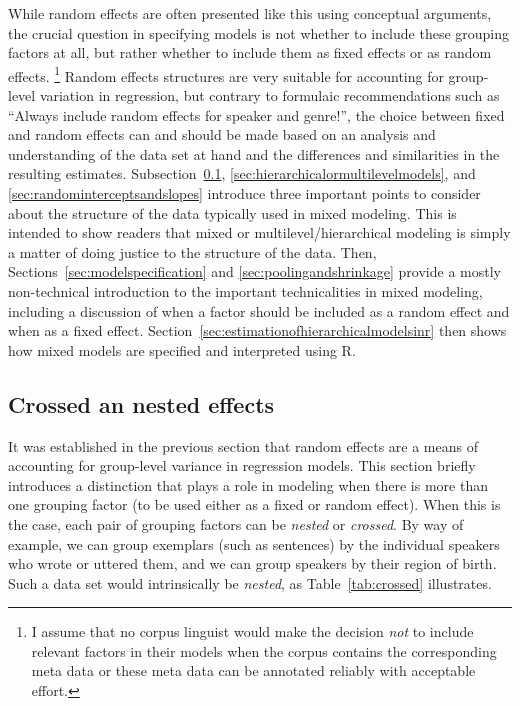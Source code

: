 \documentclass[a4paper,12pt]{article}
\begin{document}
While random effects are often presented like this using conceptual arguments, the crucial question in specifying models is not whether to include these grouping factors at all, but rather whether to include them as fixed effects or as random effects.%
\footnote{I assume that no corpus linguist would make the decision \textit{not} to include relevant factors in their models when the corpus contains the corresponding meta data or these meta data can be annotated reliably with acceptable effort.}
Random effects structures are very suitable for accounting for group-level variation in regression, but contrary to formulaic recommendations such as ``Always include random effects for speaker and genre!'', the choice between fixed and random effects can and should be made based on an analysis and understanding of the data set at hand and the differences and similarities in the resulting estimates.
Subsection~\ref{sec:crossedandnestedeffects}, \ref{sec:hierarchicalormultilevelmodels}, and \ref{sec:randominterceptsandslopes} introduce three important points to consider about the structure of the data typically used in mixed modeling.
This is intended to show readers that mixed or multilevel\slash hierarchical modeling is simply a matter of doing justice to the structure of the data.
Then, Sections~\ref{sec:modelspecification} and \ref{sec:poolingandshrinkage} provide a mostly non-technical introduction to the important technicalities in mixed modeling, including a discussion of when a factor should be included as a random effect and when as a fixed effect.
Section~\ref{sec:estimationofhierarchicalmodelsinr} then shows how mixed models are specified and interpreted using R.


\subsection{Crossed an nested effects}
\label{sec:crossedandnestedeffects}

It was established in the previous section that random effects are a means of accounting for group-level variance in regression models.
This section briefly introduces a distinction that plays a role in modeling when there is more than one grouping factor (to be used either as a fixed or random effect).
When this is the case, each pair of grouping factors can be \textit{nested} or \textit{crossed}.
By way of example, we can group exemplars (such as sentences) by the individual speakers who wrote or uttered them, and we can group speakers by their region of birth.
Such a data set would intrinsically be \textit{nested}, as Table~\ref{tab:crossed} illustrates.
\end{document}
